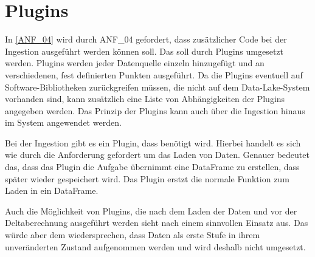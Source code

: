\section{Plugins}

In \ref{ANF_04} wird durch ANF\_04 gefordert, dass zusätzlicher Code bei der Ingestion ausgeführt werden können soll.
Das soll durch Plugins umgesetzt werden.
Plugins werden jeder Datenquelle einzeln hinzugefügt und an verschiedenen, fest definierten Punkten ausgeführt.
Da die Plugins eventuell auf Software-Bibliotheken zurückgreifen müssen, die nicht auf dem Data-Lake-System vorhanden sind, kann zusätzlich eine Liste von Abhängigkeiten der Plugins angegeben werden.
Das Prinzip der Plugins kann auch über die Ingestion hinaus im System angewendet werden.

Bei der Ingestion gibt es ein Plugin, dass benötigt wird.
Hierbei handelt es sich wie durch die Anforderung gefordert um das Laden von Daten.
Genauer bedeutet das, dass das Plugin die Aufgabe übernimmt eine DataFrame zu erstellen, dass später wieder gespeichert wird.
Das Plugin erstzt die normale Funktion zum Laden in ein DataFrame.

Auch die Möglichkeit von Plugins, die nach dem Laden der Daten und vor der Deltaberechnung ausgeführt werden sieht nach einem sinnvollen Einsatz aus.
Das würde aber dem wiedersprechen, dass Daten als erste Stufe in ihrem unveränderten Zustand aufgenommen werden und wird deshalb nicht umgesetzt.